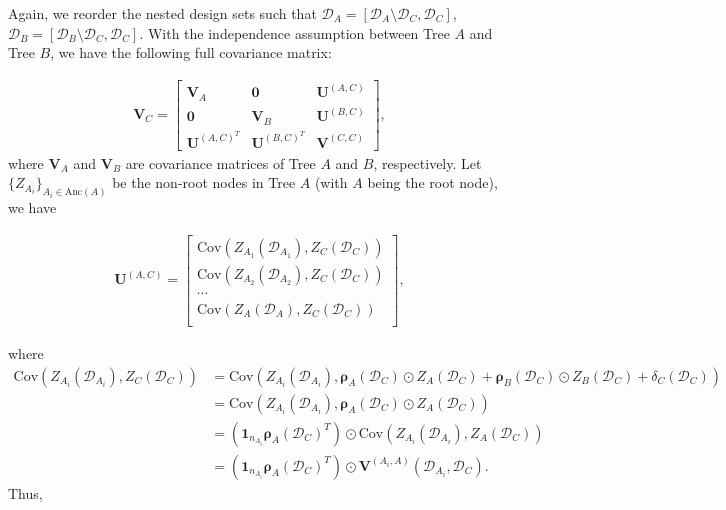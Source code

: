 \documentclass[12pt]{article}
\newcommand{\bs}[1]{\boldsymbol{#1}}
\begin{document}
Again, we reorder the nested design sets such that $\mathcal{D}_A=[\mathcal{D}_A\setminus \mathcal{D}_C,\mathcal{D}_C]$, $\mathcal{D}_B=[\mathcal{D}_B\setminus \mathcal{D}_C,\mathcal{D}_C]$. With the independence assumption between Tree $A$ and Tree $B$, we have the following full covariance matrix:

\begin{align*}
\bs{V}_C = 
    \begin{bmatrix}
        \bs{V}_A & \bs{0} & \bs{U}^{(A,C)}\\
        \bs{0} & \bs{V}_B & \bs{U}^{(B,C)}\\
        \bs{U}^{(A,C)^T} & \bs{U}^{(B,C)^T} & \bs{V}^{(C,C)}
    \end{bmatrix},
\end{align*}
where $\bs{V}_A$ and $\bs{V}_B$ are covariance matrices of Tree $A$ and $B$, respectively. Let $\{Z_{A_i}\}_{A_i\in \text{Anc}(A)}$ be the non-root nodes in Tree $A$ (with $A$ being the root node), we have

\begin{align*}
\bs{U}^{(A,C)} = 
    \begin{bmatrix}
        \text{Cov}(Z_{A_1}(\mathcal{D}_{A_1}), Z_C(\mathcal{D}_C))\\
        \text{Cov}(Z_{A_2}(\mathcal{D}_{A_2}), Z_C(\mathcal{D}_C))\\
        \cdots\\
        \text{Cov}(Z_{A}(\mathcal{D}_{A}), Z_C(\mathcal{D}_C))\\
    \end{bmatrix},
\end{align*}

where
\begin{align*}
    \text{Cov}(Z_{A_i}(\mathcal{D}_{A_i}),Z_C(\mathcal{D}_C)) &= \text{Cov}(Z_{A_i}(\mathcal{D}_{A_i}),\bs{\rho}_A(\mathcal{D}_C)\odot Z_A(\mathcal{D}_C)+\bs{\rho}_B(\mathcal{D}_C)\odot Z_B(\mathcal{D}_C)+\delta_C(\mathcal{D}_C))\\
    &= \text{Cov}(Z_{A_i}(\mathcal{D}_{A_i}),\bs{\rho}_A(\mathcal{D}_C)\odot Z_A(\mathcal{D}_C))\\
    &= (\bs{1}_{n_{A_i}}\bs{\rho}_A(\mathcal{D}_C)^T)\odot\text{Cov}(Z_{A_i}(\mathcal{D}_{A_i}),Z_A(\mathcal{D}_C))\\
    &= (\bs{1}_{n_{A_i}}\bs{\rho}_A(\mathcal{D}_C)^T)\odot \bs{V}^{(A_i,A)}(\mathcal{D}_{A_i},\mathcal{D}_C).
\end{align*}
Thus,
\end{document}
